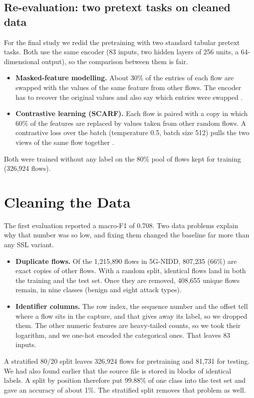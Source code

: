 \subsection{Re-evaluation: two pretext tasks on cleaned data}
For the final study we redid the pretraining with two standard tabular pretext tasks. Both use the same encoder (83 inputs, two hidden layers of 256 units, a 64-dimensional output), so the comparison between them is fair.
\begin{itemize}
\item \textbf{Masked-feature modelling.} About 30\% of the entries of each flow are swapped with the values of the same feature from other flows. The encoder has to recover the original values and also say which entries were swapped \cite{yoon2020vime}.
\item \textbf{Contrastive learning (SCARF).} Each flow is paired with a copy in which 60\% of the features are replaced by values taken from other random flows. A contrastive loss over the batch (temperature 0.5, batch size 512) pulls the two views of the same flow together \cite{bahri2022scarf}.
\end{itemize}
Both were trained without any label on the 80\% pool of flows kept for training (326{,}924 flows).

\section{Cleaning the Data}
The first evaluation reported a macro-F1 of 0.708. Two data problems explain why that number was so low, and fixing them changed the baseline far more than any SSL variant.
\begin{itemize}
\item \textbf{Duplicate flows.} Of the 1{,}215{,}890 flows in 5G-NIDD, 807{,}235 (66\%) are exact copies of other flows. With a random split, identical flows land in both the training and the test set. Once they are removed, 408{,}655 unique flows remain, in nine classes (benign and eight attack types).
\item \textbf{Identifier columns.} The row index, the sequence number and the offset tell where a flow sits in the capture, and that gives away its label, so we dropped them. The other numeric features are heavy-tailed counts, so we took their logarithm, and we one-hot encoded the categorical ones. That leaves 83 inputs.
\end{itemize}
A stratified 80/20 split leaves 326{,}924 flows for pretraining and 81{,}731 for testing. We had also found earlier that the source file is stored in blocks of identical labels. A split by position therefore put 99.88\% of one class into the test set and gave an accuracy of about 1\%. The stratified split removes that problem as well.

